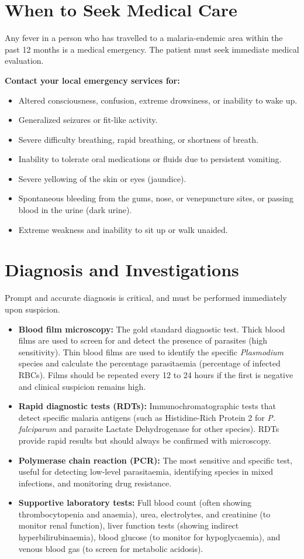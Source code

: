 \section*{When to Seek Medical Care}
Any fever in a person who has travelled to a malaria-endemic area within the past 12 months is a medical emergency. The patient must seek immediate medical evaluation.

\textbf{Contact your local emergency services for:}
\begin{itemize}
    \item Altered consciousness, confusion, extreme drowsiness, or inability to wake up.
    \item Generalized seizures or fit-like activity.
    \item Severe difficulty breathing, rapid breathing, or shortness of breath.
    \item Inability to tolerate oral medications or fluids due to persistent vomiting.
    \item Severe yellowing of the skin or eyes (jaundice).
    \item Spontaneous bleeding from the gums, nose, or venepuncture sites, or passing blood in the urine (dark urine).
    \item Extreme weakness and inability to sit up or walk unaided.
\end{itemize}

\section*{Diagnosis and Investigations}
Prompt and accurate diagnosis is critical, and must be performed immediately upon suspicion.
\begin{itemize}
    \item \textbf{Blood film microscopy:} The gold standard diagnostic test. Thick blood films are used to screen for and detect the presence of parasites (high sensitivity). Thin blood films are used to identify the specific \textit{Plasmodium} species and calculate the percentage parasitaemia (percentage of infected RBCs). Films should be repeated every 12 to 24 hours if the first is negative and clinical suspicion remains high.
    \item \textbf{Rapid diagnostic tests (RDTs):} Immunochromatographic tests that detect specific malaria antigens (such as Histidine-Rich Protein 2 for \textit{P. falciparum} and parasite Lactate Dehydrogenase for other species). RDTs provide rapid results but should always be confirmed with microscopy.
    \item \textbf{Polymerase chain reaction (PCR):} The most sensitive and specific test, useful for detecting low-level parasitaemia, identifying species in mixed infections, and monitoring drug resistance.
    \item \textbf{Supportive laboratory tests:} Full blood count (often showing thrombocytopenia and anaemia), urea, electrolytes, and creatinine (to monitor renal function), liver function tests (showing indirect hyperbilirubinaemia), blood glucose (to monitor for hypoglycaemia), and venous blood gas (to screen for metabolic acidosis).
\end{itemize}


